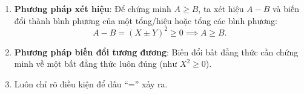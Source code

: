 \begin{enumerate}
\item \textbf{Phương pháp xét hiệu}: Để chứng minh $A \ge B$, ta xét hiệu $A - B$ và biến đổi thành bình phương của một tổng/hiệu hoặc tổng các bình phương:
$$A - B = (X \pm Y)^2 \ge 0 \implies A \ge B.$$
\item \textbf{Phương pháp biến đổi tương đương}: Biến đổi bất đẳng thức cần chứng minh về một bất đẳng thức luôn đúng (như $X^2 \ge 0$).
\item Luôn chỉ rõ điều kiện để dấu ``='' xảy ra.
\end{enumerate}
